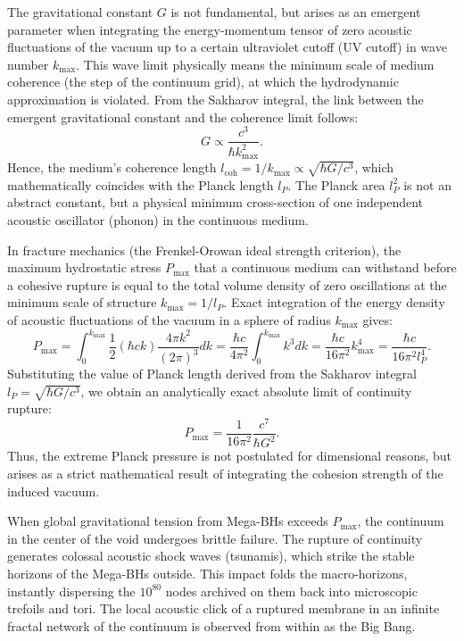 \documentclass[11pt,a4paper]{article}
\begin{document}
	The gravitational constant $G$ is not fundamental, but arises as an emergent parameter when integrating the energy-momentum tensor of zero acoustic fluctuations of the vacuum up to a certain ultraviolet cutoff (UV cutoff) in wave number $k_{\text{max}}$. This wave limit physically means the minimum scale of medium coherence (the step of the continuum grid), at which the hydrodynamic approximation is violated.
	From the Sakharov integral, the link between the emergent gravitational constant and the coherence limit follows:
	\begin{equation}
		G \propto \frac{c^3}{\hbar k_{\text{max}}^2}.
	\end{equation}
	Hence, the medium's coherence length $l_{\text{coh}} = 1/k_{\text{max}} \propto \sqrt{\hbar G / c^3}$, which mathematically coincides with the Planck length $l_P$. The Planck area $l_P^2$ is not an abstract constant, but a physical minimum cross-section of one independent acoustic oscillator (phonon) in the continuous medium.
	
	In fracture mechanics (the Frenkel-Orowan ideal strength criterion), the maximum hydrostatic stress $P_{\text{max}}$ that a continuous medium can withstand before a cohesive rupture is equal to the total volume density of zero oscillations at the minimum scale of structure $k_{\text{max}} = 1/l_P$.
	Exact integration of the energy density of acoustic fluctuations of the vacuum in a sphere of radius $k_{\text{max}}$ gives:
	\begin{equation}
		P_{\text{max}} = \int_0^{k_{\text{max}}} \frac{1}{2} (\hbar c k) \frac{4\pi k^2}{(2\pi)^3} dk = \frac{\hbar c}{4\pi^2} \int_0^{k_{\text{max}}} k^3 dk = \frac{\hbar c}{16\pi^2} k_{\text{max}}^4 = \frac{\hbar c}{16\pi^2 l_P^4}.
	\end{equation}
	Substituting the value of Planck length derived from the Sakharov integral $l_P = \sqrt{\hbar G / c^3}$, we obtain an analytically exact absolute limit of continuity rupture:
	\begin{equation}
		P_{\text{max}} = \frac{1}{16\pi^2} \frac{c^7}{\hbar G^2}.
	\end{equation}
	Thus, the extreme Planck pressure is not postulated for dimensional reasons, but arises as a strict mathematical result of integrating the cohesion strength of the induced vacuum.
	
	When global gravitational tension from Mega-BHs exceeds $P_{\text{max}}$, the continuum in the center of the void undergoes brittle failure. The rupture of continuity generates colossal acoustic shock waves (tsunamis), which strike the stable horizons of the Mega-BHs outside. This impact folds the macro-horizons, instantly dispersing the $10^{80}$ nodes archived on them back into microscopic trefoils and tori. The local acoustic click of a ruptured membrane in an infinite fractal network of the continuum is observed from within as the Big Bang.
	
\end{document}
